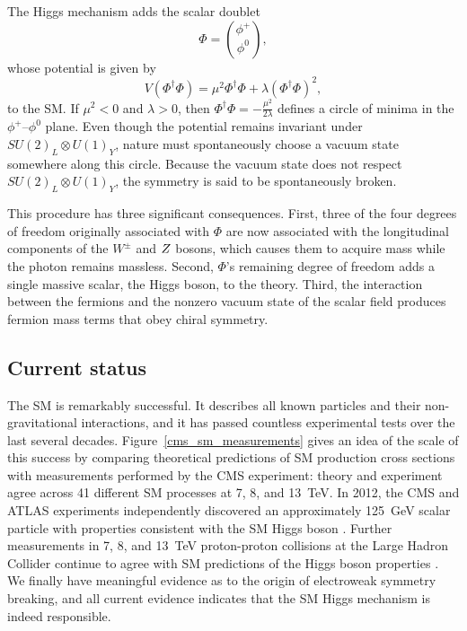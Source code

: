 The Higgs mechanism adds the scalar doublet
\begin{equation}
    \Phi = \binom{\phi^{+}}{\phi^{0}},
\end{equation}
whose potential is given by
\begin{equation}
    V(\Phi^{\dagger}\Phi) = \mu^{2}\Phi^{\dagger}\Phi + \lambda(\Phi^{\dagger}\Phi)^{2},
\end{equation}
to the SM. If $\mu^{2}<0$ and $\lambda>0$, then $\Phi^{\dagger}\Phi = -\frac{\mu^{2}}{2\lambda}$ defines a circle of minima in the $\phi^{+}$--$\phi^{0}$ plane. Even though the potential remains invariant under $SU(2)_{L} \otimes U(1)_{Y}$, nature must spontaneously choose a vacuum state somewhere along this circle. Because the vacuum state does not respect $SU(2)_{L} \otimes U(1)_{Y}$, the symmetry is said to be spontaneously broken.

This procedure has three significant consequences. First, three of the four degrees of freedom originally associated with $\Phi$ are now associated with the longitudinal components of the $W^{\pm}$ and $Z$ bosons, which causes them to acquire mass while the photon remains massless. Second, $\Phi$'s remaining degree of freedom adds a single massive scalar, the Higgs boson, to the theory. Third, the interaction between the fermions and the nonzero vacuum state of the scalar field produces fermion mass terms that obey chiral symmetry.


\subsection{Current status}
\label{sm_status}
The SM is remarkably successful. It describes all known particles and their non-gravitational interactions, and it has passed countless experimental tests over the last several decades. Figure~\ref{cms_sm_measurements} gives an idea of the scale of this success by comparing theoretical predictions of SM production cross sections with measurements performed by the CMS experiment: theory and experiment agree across 41 different SM processes at \num{7}, \num{8}, and \SI{13}{\TeV}. In 2012, the CMS and ATLAS experiments  independently discovered an approximately \SI{125}{\GeV} scalar particle with properties consistent with the SM Higgs boson \cite{cms_higgs, atlas_higgs}. Further measurements in \num{7}, \num{8}, and \SI{13}{\TeV} proton-proton collisions at the Large Hadron Collider continue to agree with SM predictions of the Higgs boson properties \cite{cms_higgs_summary, atlas_higgs_summary}. We finally have meaningful evidence as to the origin of electroweak symmetry breaking, and all current evidence indicates that the SM Higgs mechanism is indeed responsible.

